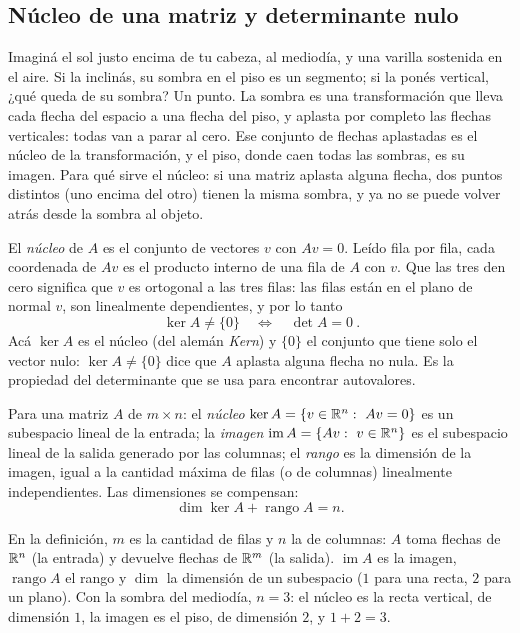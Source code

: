\subsection{Núcleo de una matriz y determinante nulo}\label{sec:nucleo}

Imaginá el sol justo encima de tu cabeza, al mediodía, y una varilla sostenida en el aire.
Si la inclinás, su sombra en el piso es un segmento; si la ponés vertical, ¿qué queda de su
sombra?
Un punto. La sombra es una transformación que lleva cada flecha del espacio a una flecha del
piso, y aplasta por completo las flechas verticales: todas van a parar al cero. Ese conjunto
de flechas aplastadas es el núcleo de la transformación, y el piso, donde caen todas las
sombras, es su imagen. Para qué sirve el núcleo: si una matriz aplasta alguna flecha, dos
puntos distintos (uno encima del otro) tienen la misma sombra, y ya no se puede volver atrás
desde la sombra al objeto.

El \emph{núcleo} de \(A\) es el conjunto de vectores \(v\) con \(Av=0\). Leído fila por fila,
cada coordenada de \(Av\) es el producto interno de una fila de \(A\) con \(v\). Que las tres
den cero significa que \(v\) es ortogonal a las tres filas: las filas están en el plano de
normal \(v\), son linealmente dependientes, y por lo tanto
\[
  \boxed{\ \ker A\neq\{0\}\quad\Longleftrightarrow\quad\det A=0\ }.
\]
Acá \(\ker A\) es el núcleo (del alemán \emph{Kern}) y \(\{0\}\) el conjunto que tiene solo
el vector nulo: \(\ker A\neq\{0\}\) dice que \(A\) aplasta alguna flecha no nula. Es la
propiedad del determinante que se usa para encontrar autovalores.

\begin{definicion}\label{def:nucleo-imagen}
Para una matriz \(A\) de \(m\times n\): el \emph{núcleo} \(\ker A=\{v\in\R^n:\ Av=0\}\) es un
subespacio lineal de la entrada; la \emph{imagen} \(\operatorname{im}A=\{Av:\ v\in\mathbb{R}^n\}\) es
el subespacio lineal de la salida generado por las columnas; el \emph{rango} es la dimensión
de la imagen, igual a la cantidad máxima de filas (o de columnas) linealmente independientes.
Las dimensiones se compensan:
\[
  \dim\ker A+\operatorname{rango}A=n .
\]
\end{definicion}

En la definición, \(m\) es la cantidad de filas y \(n\) la de columnas: \(A\) toma flechas de
\(\mathbb{R}^n\) (la entrada) y devuelve flechas de \(\mathbb{R}^m\) (la salida). \(\operatorname{im}A\) es la
imagen, \(\operatorname{rango}A\) el rango y \(\dim\) la dimensión de un subespacio (\(1\) para
una recta, \(2\) para un plano). Con la sombra del mediodía, \(n=3\): el núcleo es la recta
vertical, de dimensión \(1\), la imagen es el piso, de dimensión \(2\), y \(1+2=3\).

